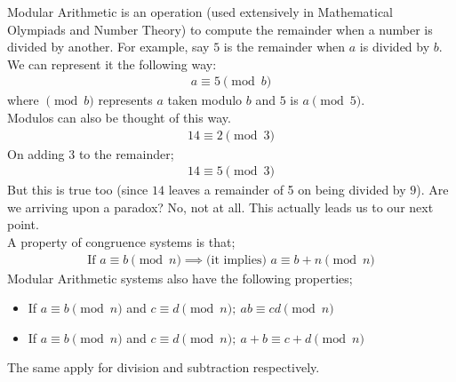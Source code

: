 \begin{mathbox}{}
{Modular Arithmetic is an operation (used extensively in Mathematical Olympiads and Number Theory) to compute the remainder when a number is divided by another. For example, say $5$ is the remainder when $a$ is divided by $b$. We can represent it the following way:
\begin{align*}
    a \equiv 5 \pmod b
\end{align*}
where $\pmod b$ represents $a$ taken modulo $b$ and $5$ is $a \pmod 5$.\\
Modulos can also be thought of this way. 
\begin{align*}
    14 \equiv 2 \pmod 3
\end{align*}
On adding $3$ to the remainder;   
\begin{align*}
     14 \equiv 5 \pmod 3
\end{align*}
But this is true too (since $14$ leaves a remainder of 5 on being divided by $9$). Are we arriving upon a paradox? No, not at all.
This actually leads us to our next point.\\
A property of congruence systems is that;
\begin{align*}
    \text{If } a \equiv b \pmod n \implies \text{(it implies) } a \equiv b + n \pmod{n}
\end{align*}
Modular Arithmetic systems also have the following properties;
\begin{itemize}
    \item{If $a \equiv b \pmod n$ and $c \equiv d \pmod n;~ab \equiv cd \pmod n$}
    \item{If $a \equiv b \pmod n$ and $c \equiv d \pmod n;~a + b \equiv c + d \pmod n$}
\end{itemize}
The same apply for division and subtraction respectively.}
\end{mathbox}
